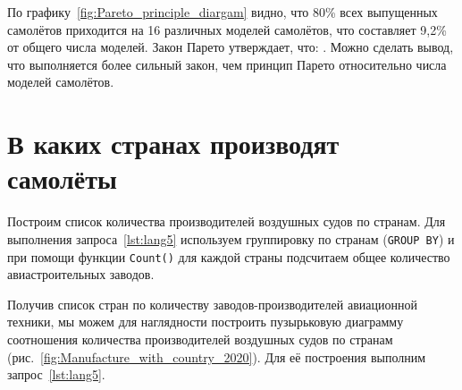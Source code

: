По графику~\ref{fig:Pareto_principle_diargam} видно, что 80\% всех выпущенных самолётов приходится на 16 различных моделей самолётов, что составляет 9,2\% от общего числа моделей. Закон Парето утверждает, что: . Можно сделать вывод, что выполняется более сильный закон, чем принцип Парето относительно числа моделей самолётов.



\section{В каких странах производят самолёты}

Построим список количества производителей воздушных судов по странам. 
Для выполнения запроса~\ref{lst:lang5} 
используем группировку по странам (\lstinline|GROUP BY|) 
и при помощи функции \lstinline|Count()| для каждой страны подсчитаем общее количество авиастроительных заводов.



Получив список стран по количеству заводов-производителей авиационной техники, 
мы можем для наглядности построить пузырьковую диаграмму 
соотношения количества производителей воздушных судов по странам (рис.~\ref{fig:Manufacture_with_country_2020}). 
Для её построения выполним запрос~\ref{lst:lang5}.

